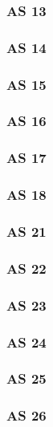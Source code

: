 \subsubsection{AS 13}

\subsubsection{AS 14}

\subsubsection{AS 15}

\subsubsection{AS 16}

\subsubsection{AS 17}

\subsubsection{AS 18}

\subsubsection{AS 21}

\subsubsection{AS 22}

\subsubsection{AS 23}

\subsubsection{AS 24}

\subsubsection{AS 25}

\subsubsection{AS 26}

